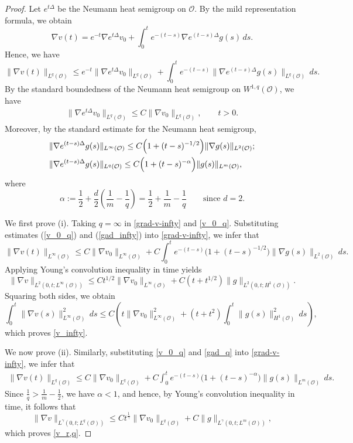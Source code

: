 \documentclass[reqno, 11pt]{amsart}
\theoremstyle{definition}
\numberwithin{equation}{section} \numberwithin{lem}{section}
\numberwithin{thm}{section} \numberwithin{prop}{section}
\numberwithin{cor}{section} \numberwithin{rem}{section}
\numberwithin{defn}{section}
\begin{document}
\begin{proof}
	 Let $e^{t\Delta}$ be the Neumann heat semigroup on $\mathcal O$.
	By the mild representation formula,
	 we obtain
	\[
	\nabla v(t)
	=
	e^{-t}\nabla e^{t\Delta}v_0
	+
	\int_0^t e^{-(t-s)}\nabla e^{(t-s)\Delta}g(s)\,ds.
	\]
	Hence, we have 
	\begin{equation}\label{grad-v-infty}
		\|\nabla v(t)\|_{L^q(\mathcal O)}
		\le
		e^{-t}\|\nabla e^{t\Delta}v_0\|_{L^q(\mathcal O)}
		+
		\int_0^t e^{-(t-s)}
		\|\nabla e^{(t-s)\Delta}g(s)\|_{L^q(\mathcal O)}\,ds.
	\end{equation}
    By the standard boundedness of the Neumann heat semigroup on $W^{1,q}(\mathcal O)$, we have
	\begin{align}\label{v_0_q}
	    \|\nabla e^{t\Delta}v_0\|_{L^q(\mathcal O)}
	\le
	C\|\nabla v_0\|_{L^q(\mathcal O)},
	\qquad t>0.
	\end{align}
    Moreover, by the standard  estimate \cite [Lemma 1.3]{winkler2010aggregation} for the Neumann heat semigroup,
    \begin{align}
        \label{gad_infty}&\|\nabla e^{(t-s)\Delta}g(s)\|_{L^\infty(\mathcal O)}
	\le
	C\Bigl(1+(t-s)^{-1/2}\Bigr)\|\nabla g(s)\|_{L^2(\mathcal O)};\\
    \label{gad_q}&\|\nabla e^{(t-s)\Delta}g(s)\|_{L^q(\mathcal O)}
	\le
	C\Bigl(1+(t-s)^{-\alpha}\Bigr)\|g(s)\|_{L^m(\mathcal O)},
    \end{align}
	where
	\[
	\alpha:=\frac12+\frac d2\left(\frac1m-\frac1q\right)
	=
	\frac12+\frac1m-\frac1q
	\qquad \text{since } d=2.
	\]
    
	We first prove (i). Taking $q=\infty$ in \eqref{grad-v-infty} and \eqref{v_0_q}.
	Substituting  estimates (\ref{v_0_q}) and (\ref{gad_infty})  into \eqref{grad-v-infty}, we infer that
	\[
	\|\nabla v(t)\|_{L^\infty(\mathcal O)}
	\le
	C\|\nabla v_0\|_{L^\infty(\mathcal O)}
	+
	C\int_0^t e^{-(t-s)}
	\big(1+(t-s)^{-1/2}\big)\|\nabla g(s)\|_{L^2(\mathcal O)}\,ds.
	\]
	Applying Young's convolution inequality in time yields
	\[
	\|\nabla v\|_{L^2(0,t;L^\infty(\mathcal O))}
	\le
	Ct^{1/2}\|\nabla v_0\|_{L^\infty(\mathcal O)}
	+
C(t+t^{1/2})\|g\|_{L^2(0,t;H^1(\mathcal O))}.
	\]
	Squaring both sides, we obtain
	\[
	\int_0^t \|\nabla v(s)\|_{L^\infty(\mathcal O)}^2\,ds
	\le
	C\left(
	t\|\nabla v_0\|_{L^\infty(\mathcal O)}^2
	+
	(t+t^2)\int_0^t \|g(s)\|_{H^1(\mathcal O)}^2\,ds
	\right),
	\]
	which proves \eqref{v_infty}.
    
		We now prove (ii). Similarly, 
	substituting \eqref{v_0_q} and \eqref{gad_q}  into \eqref{grad-v-infty}, we infer that
	\begin{align*}
	    \|\nabla v(t)\|_{L^q(\mathcal O)}
	\le
	C\|\nabla v_0\|_{L^q(\mathcal O)}
	+
	C\int_0^t e^{-(t-s)}
	\big(1+(t-s)^{-\alpha}\big)\|g(s)\|_{L^m(\mathcal O)}\,ds.
	\end{align*}
	Since $\frac1q>\frac1m-\frac12$,
	we have $\alpha<1$, and hence,  by Young's convolution inequality in time, it follows that
	\[
	\|\nabla v\|_{L^\gamma(0,t;L^q(\mathcal O))}
	\le
	Ct^\frac{1}{\gamma}\|\nabla v_0\|_{L^q(\mathcal O)}
	+
	C\|g\|_{L^\gamma(0,t;L^m(\mathcal O))},
	\]
	which proves \eqref{v_r,q}.
\end{proof}
\end{document}
